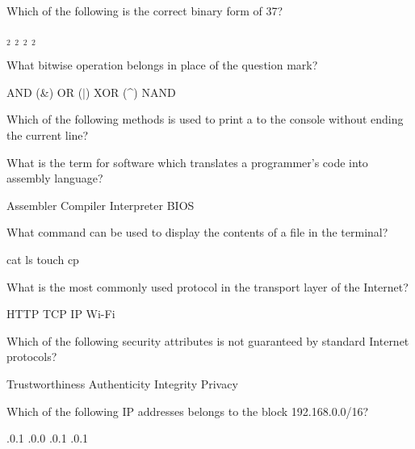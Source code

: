 \documentclass[answers,addpoints]{exam}
\begin{document}
\begin{questions}
\question[2] Which of the following is the correct binary form of 37?
\begin{choices}
    $_2$
    $_2$
    $_2$
    $_2$
\end{choices}

\question[2] What bitwise operation belongs in place of the question mark?
\begin{center}
\end{center}
\begin{choices}
    \choice AND (\&)
    \choice OR ($|$)
    \CorrectChoice XOR (\textasciicircum)
    \choice NAND
\end{choices}

\question[2] Which of the following methods is used to print a  to the console without ending the current line?
\begin{choices}
    \choice {}
    \choice {}
    \choice {}
    \CorrectChoice {}
\end{choices}

\question[2] What is the term for software which translates a programmer's code into assembly language?
\begin{choices}
    \choice Assembler
    \CorrectChoice Compiler
    \choice Interpreter
    \choice BIOS
\end{choices}

\question[2] What command can be used to display the contents of a file in the terminal?
\begin{choices}
    \CorrectChoice cat
    \choice ls
    \choice touch
    \choice cp
\end{choices}

\question[2] What is the most commonly used protocol in the transport layer of the Internet?
\begin{choices}
    \choice HTTP
    \CorrectChoice TCP
    \choice IP
    \choice Wi-Fi
\end{choices}

\question[2] Which of the following security attributes is not guaranteed by standard Internet protocols?
\begin{choices}
    \CorrectChoice Trustworthiness
    \choice Authenticity
    \choice Integrity
    \choice Privacy
\end{choices}

\question[2] Which of the following IP addresses belongs to the block 192.168.0.0/16?
\begin{choices}
    .0.1
    .0.0
    .0.1
    .0.1
\end{choices}


\end{questions}
\end{document}
